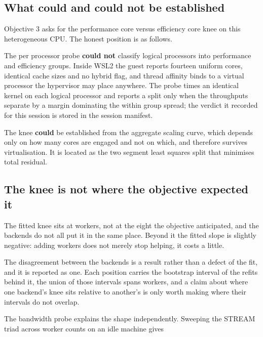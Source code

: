 

\subsection{What could and could not be established}

Objective 3 asks for the performance core versus efficiency core knee on this
heterogeneous CPU. The honest position is as follows.

The per processor probe \textbf{could not} classify logical processors into
performance and efficiency groups. Inside WSL2 the guest reports fourteen
uniform cores, identical cache sizes and no hybrid flag, and thread affinity
binds to a virtual processor the hypervisor may place anywhere. The probe times
an identical kernel on each logical processor and reports a split only when the
throughputs separate by a margin dominating the within group spread; the verdict
it recorded for this session is stored in the session manifest.

The knee \textbf{could} be established from the aggregate scaling curve, which
depends only on how many cores are engaged and not on which, and therefore
survives virtualisation. It is located as the two segment least squares split
that minimises total residual.

\subsection{The knee is not where the objective expected it}

The fitted knee sits at \pnlKneeRange{} workers, not at the eight the objective
anticipated, and the backends do not all put it in the same place. Beyond it the
fitted slope is slightly negative: adding workers does not merely stop helping,
it costs a little.



The disagreement between the backends is a result rather than a defect of the
fit, and it is reported as one. Each position carries the bootstrap interval of
the refits behind it, the union of those intervals spans \pnlKneeInterval{}
workers, and a claim about where one backend's knee sits relative to another's
is only worth making where their intervals do not overlap.

The bandwidth probe explains the shape independently. Sweeping the STREAM triad
across worker counts on an idle machine gives



